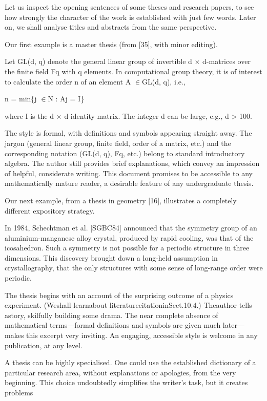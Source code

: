 \documentclass[11pt]{article}
\theoremstyle{plain}
\theoremstyle{definition}
\begin{document}
Let us inspect the opening sentences of some theses and research papers, to see how strongly the character of the work is established with just few words. Later on, we shall analyse titles and abstracts from the same perspective.

Our first example is a master thesis (from [35], with minor editing).

Let GL(d, q) denote the general linear group of invertible d $\times$ d-matrices over the finite field Fq with q elements. In computational group theory, it is of interest to calculate the order n of an element A $\in$GL(d, q), i.e.,

n = min\{j $\in$N : Aj = I\}

where I is the d $\times$ d identity matrix. The integer d can be large, e.g., d > 100.

The style is formal, with definitions and symbols appearing straight away. The jargon (general linear group, finite field, order of a matrix, etc.) and the corresponding notation (GL(d, q), Fq, etc.) belong to standard introductory algebra. The author still provides brief explanations, which convey an impression of helpful, considerate writing. This document promises to be accessible to any mathematically mature reader, a desirable feature of any undergraduate thesis.

Our next example, from a thesis in geometry [16], illustrates a completely different expository strategy.

In 1984, Schechtman et al. [SGBC84] announced that the symmetry group of an aluminium-manganese alloy crystal, produced by rapid cooling, was that of the icosahedron. Such a symmetry is not possible for a periodic structure in three dimensions. This discovery brought down a long-held assumption in crystallography, that the only structures with some sense of long-range order were periodic.

The thesis begins with an account of the surprising outcome of a physics experiment. (Weshall learnabout literaturecitationinSect.10.4.) Theauthor tells astory, skilfully building some drama. The near complete absence of mathematical terms---formal definitions and symbols are given much later---makes this excerpt very inviting. An engaging, accessible style is welcome in any publication, at any level.

A thesis can be highly specialised. One could use the established dictionary of a particular research area, without explanations or apologies, from the very beginning. This choice undoubtedly simplifies the writer's task, but it creates problems
\end{document}
